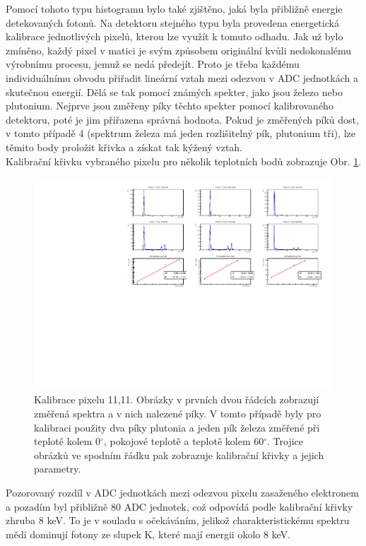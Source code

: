 Pomocí tohoto typu histogramu bylo také zjištěno, jaká byla přibližně energie detekovaných fotonů. Na detektoru stejného typu byla provedena energetická kalibrace jednotlivých pixelů, kterou lze využít k tomuto odhadu. Jak už bylo zmíněno, každý pixel v matici je svým způsobem originální kvůli nedokonalému výrobnímu procesu, jemuž se nedá předejít. Proto je třeba každému individuálnímu obvodu přiřadit lineární vztah mezi odezvou v ADC jednotkách a skutečnou energií. Dělá se tak pomocí známých spekter, jako jsou železo nebo plutonium. Nejprve jsou změřeny píky těchto spekter pomocí kalibrovaného detektoru, poté je jim přiřazena správná hodnota. Pokud je změřených píků dost, v tomto případě 4 (spektrum železa má jeden rozlišitelný pík, plutonium tři), lze těmito body proložit křivka a získat tak kýžený vztah.\\
Kalibrační křivku vybraného pixelu pro několik teplotních bodů zobrazuje Obr. \ref{Obrazek_kalibrace}.

 \begin{figure}[htbp!]
\centering
\includegraphics[scale = 0.85]{Figure/calibration.pdf}
 \caption{Kalibrace pixelu 11,11. Obrázky v prvních dvou řádcích zobrazují změřená spektra a v nich nalezené píky. V tomto případě byly pro kalibraci použity dva píky plutonia a jeden pík železa změřené při teplotě kolem 0$^{\circ}$, pokojové teplotě a teplotě kolem 60$^{\circ}$. Trojice obrázků ve spodním řádku pak zobrazuje kalibrační křivky a jejich parametry.}
\label{Obrazek_kalibrace}
\end{figure}

Pozorovaný rozdíl v ADC jednotkách mezi odezvou pixelu zasaženého elektronem a pozadím byl přibližně 80 ADC jednotek, což odpovídá podle kalibrační křivky zhruba 8 keV. To je v souladu s očekáváním, jelikož charakteristickému spektru mědi dominují fotony ze slupek K, které mají energii okolo 8 keV. 

